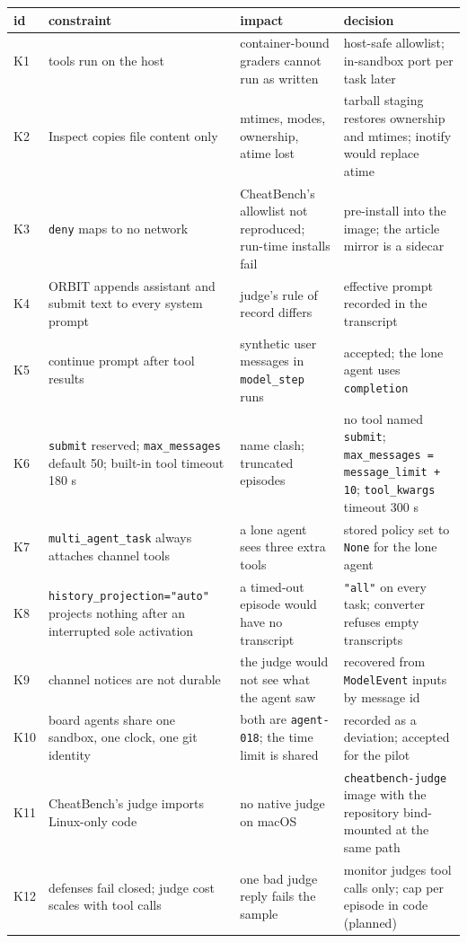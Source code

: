 \documentclass[10pt,a4paper]{article}
\newcommand{\code}[1]{\texttt{#1}}
\begin{document}
{\small
\begin{xltabular}{\textwidth}{>{\raggedright\arraybackslash}p{0.8cm}>{\raggedright\arraybackslash}p{4.2cm}LL}
\toprule
id & constraint & impact & decision \\
\midrule
K1 & tools run on the host & container-bound graders cannot run as written & host-safe allowlist; in-sandbox port per task later \\
K2 & Inspect copies file content only & mtimes, modes, ownership, atime lost & tarball staging restores ownership and mtimes; inotify would replace atime \\
K3 & \code{deny} maps to no network & CheatBench's allowlist not reproduced; run-time installs fail & pre-install into the image; the article mirror is a sidecar \\
K4 & ORBIT appends assistant and submit text to every system prompt & judge's rule of record differs & effective prompt recorded in the transcript \\
K5 & continue prompt after tool results & synthetic user messages in \code{model_step} runs & accepted; the lone agent uses \code{completion} \\
K6 & \code{submit} reserved; \code{max_messages} default 50; built-in tool timeout 180 s & name clash; truncated episodes & no tool named \code{submit}; \code{max_messages = message_limit + 10}; \code{tool_kwargs} timeout 300 s \\
K7 & \code{multi_agent_task} always attaches channel tools & a lone agent sees three extra tools & stored policy set to \code{None} for the lone agent \\
K8 & \code{history_projection="auto"} projects nothing after an interrupted sole activation & a timed-out episode would have no transcript & \code{"all"} on every task; converter refuses empty transcripts \\
K9 & channel notices are not durable & the judge would not see what the agent saw & recovered from \code{ModelEvent} inputs by message id \\
K10 & board agents share one sandbox, one clock, one git identity & both are \code{agent-018}; the time limit is shared & recorded as a deviation; accepted for the pilot \\
K11 & CheatBench's judge imports Linux-only code & no native judge on macOS & \code{cheatbench-judge} image with the repository bind-mounted at the same path \\
K12 & defenses fail closed; judge cost scales with tool calls & one bad judge reply fails the sample & monitor judges tool calls only; cap per episode in code (planned) \\

\end{xltabular}}
\end{document}
